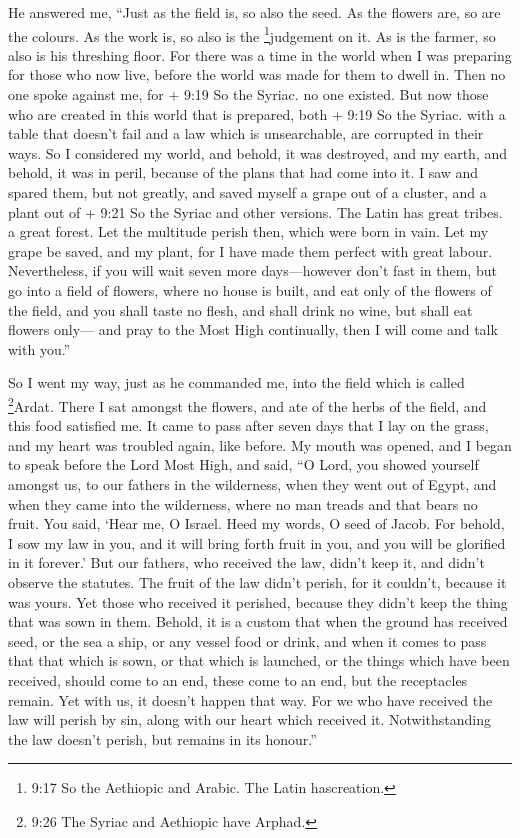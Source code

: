  He answered me, ``Just as the field is, so also the seed.
As the flowers are, so are the colours. As the work is, so also is the
\footnote{9:17 So the Aethiopic and Arabic. The Latin hascreation.}judgement
on it. As is the farmer, so also is his threshing floor. For there was a
time in the world  when I was preparing for those who now
live, before the world was made for them to dwell in. Then no one spoke
against me,  for + 9:19 So the Syriac. no one existed. But
now those who are created in this world that is prepared, both + 9:19 So
the Syriac. with a table that doesn't fail and a law which is
unsearchable, are corrupted in their ways.  So I considered
my world, and behold, it was destroyed, and my earth, and behold, it was
in peril, because of the plans that had come into it.  I
saw and spared them, but not greatly, and saved myself a grape out of a
cluster, and a plant out of + 9:21 So the Syriac and other versions. The
Latin has great tribes. a great forest.  Let the multitude
perish then, which were born in vain. Let my grape be saved, and my
plant, for I have made them perfect with great labour. 
Nevertheless, if you will wait seven more days---however don't fast in
them,  but go into a field of flowers, where no house is
built, and eat only of the flowers of the field, and you shall taste no
flesh, and shall drink no wine, but shall eat flowers only---
 and pray to the Most High continually, then I will come
and talk with you.''

 So I went my way, just as he commanded me, into the field
which is called \footnote{9:26 The Syriac and Aethiopic have Arphad.}Ardat.
There I sat amongst the flowers, and ate of the herbs of the field, and
this food satisfied me.  It came to pass after seven days
that I lay on the grass, and my heart was troubled again, like before.
 My mouth was opened, and I began to speak before the Lord
Most High, and said,  ``O Lord, you showed yourself amongst
us, to our fathers in the wilderness, when they went out of Egypt, and
when they came into the wilderness, where no man treads and that bears
no fruit.  You said, `Hear me, O Israel. Heed my words, O
seed of Jacob.  For behold, I sow my law in you, and it
will bring forth fruit in you, and you will be glorified in it forever.'
 But our fathers, who received the law, didn't keep it, and
didn't observe the statutes. The fruit of the law didn't perish, for it
couldn't, because it was yours.  Yet those who received it
perished, because they didn't keep the thing that was sown in them.
 Behold, it is a custom that when the ground has received
seed, or the sea a ship, or any vessel food or drink, and when it comes
to pass that that which is sown, or that which is launched,
 or the things which have been received, should come to an
end, these come to an end, but the receptacles remain. Yet with us, it
doesn't happen that way.  For we who have received the law
will perish by sin, along with our heart which received it.
 Notwithstanding the law doesn't perish, but remains in its
honour.''

